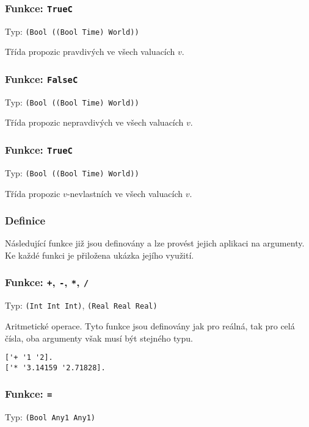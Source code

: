 \subsubsection*{Funkce: \lstinline|TrueC|}
Typ: \lstinline|(Bool ((Bool Time) World))|

Třída propozic pravdivých ve všech valuacích $v$.

\subsubsection*{Funkce: \lstinline|FalseC|}
Typ: \lstinline|(Bool ((Bool Time) World))|

Třída propozic nepravdivých ve všech valuacích $v$.

\subsubsection*{Funkce: \lstinline|TrueC|}
Typ: \lstinline|(Bool ((Bool Time) World))|

Třída propozic $v$-nevlastních ve všech valuacích $v$.

\subsubsection{Definice}

Následující funkce již jsou definovány a lze provést jejich aplikaci na argumenty. Ke každé
funkci je přiložena ukázka jejího využití.

\subsubsection*{Funkce: \lstinline|+|, \lstinline|-|, \lstinline|*|, \lstinline|/|}

Typ: \lstinline{(Int Int Int)}, \lstinline{(Real Real Real)}

Aritmetické operace. Tyto funkce jsou definovány jak pro reálná, tak pro celá čísla, oba argumenty
však musí být stejného typu.

\begin{lstlisting}[caption={Ukázka využití aritmetických operací}]
['+ '1 '2].
['* '3.14159 '2.71828].
\end{lstlisting}

\subsubsection*{Funkce: \lstinline|=|}

Typ: \lstinline{(Bool Any1 Any1)}

